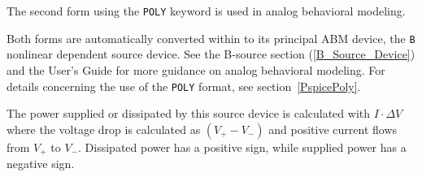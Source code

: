 \begin{Device}
The second form using the \texttt{POLY} keyword is used in analog behavioral
modeling.

Both forms are automatically converted within \Xyce{} to its principal
ABM device, the \texttt{B} nonlinear dependent source device. See the B-source
section (\ref{B_Source_Device}) and the \Xyce{} User's Guide for more guidance
on analog behavioral modeling.  For details concerning the use of the
\texttt{POLY} format, see section~\ref{PspicePoly}.

The power supplied or dissipated by this source device is calculated 
with $I \cdot \Delta V$ where the voltage drop is calculated as $(V_+ - V_-)$ 
and positive current flows from $V_+$ to $V_-$.  Dissipated power has a
positive sign, while supplied power has a negative sign.

\end{Device}
